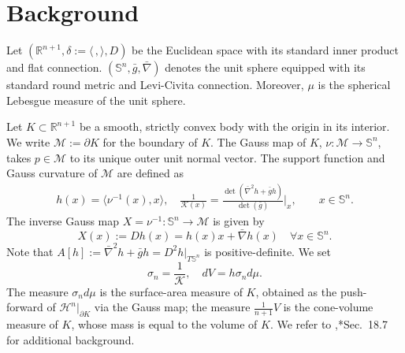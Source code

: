 \documentclass[12pt]{amsart}
\theoremstyle{definition}
\numberwithin{equation}{section}
\newcommand{\M}{\mathcal{M}}
\newcommand{\Rn}{\mathbb{R}^{n+1}}
\newcommand{\Sn}{\mathbb{S}^n}
\theoremstyle{remark}
\numberwithin{equation}{section}
\begin{document}
\section{Background}
Let $(\Rn,\delta:=\langle\,,\rangle,D)$ be the Euclidean space with its standard inner product and flat connection. 
 $(\mathbb{S}^n,\bar{g},\bar{\nabla})$ denotes the unit sphere equipped with its standard round metric and Levi-Civita connection. Moreover, $\mu$ is the spherical Lebesgue measure of the unit sphere.

Let $K \subset \Rn$ be a smooth, strictly convex body with the origin in its interior. We write $\M:=\partial K$ for the boundary of $K$. The Gauss map of $K$, $\nu: \M\to \Sn$, takes $p \in\M$ to its unique outer unit normal vector.
The support function and Gauss curvature of $\M$ are defined as
\begin{align*}
h(x)=\langle \nu^{-1}(x),x\rangle,\quad 
\frac{1}{\mathcal{K}(x)}=\frac{\det (\bar{\nabla}^2h+\bar{g}h)}{\det(\bar{g})}\Big|_x, \quad\quad x\in \Sn.
\end{align*}
The inverse Gauss map $X = \nu^{-1} : \mathbb{S}^n \rightarrow \mathcal{M}$ is given by
\[ X(x) := Dh(x)=h(x)x+\bar{\nabla}h(x)\quad \forall x\in \mathbb{S}^n.\]
Note that $A[h] := \bar{\nabla}^2h+\bar{g} h = D^2 h|_{T \mathbb{S}^n}$ is positive-definite.  
We set
\[\sigma_n=\frac{1}{\mathcal{K}} ,\quad dV=h\sigma_nd\mu. \] %
The measure $\sigma_n d\mu$ is the surface-area measure of $K$, obtained as the push-forward of $\mathcal{H}^{n}|_{\partial K}$ via the Gauss map; the measure $\frac{1}{n+1}V$ is the cone-volume measure of $K$, whose mass is equal to the volume of $K$. We refer to \cites{Sch14,KM22},\cite{ACGL20}*{Sec.~18.7} for additional background. 
\end{document}

